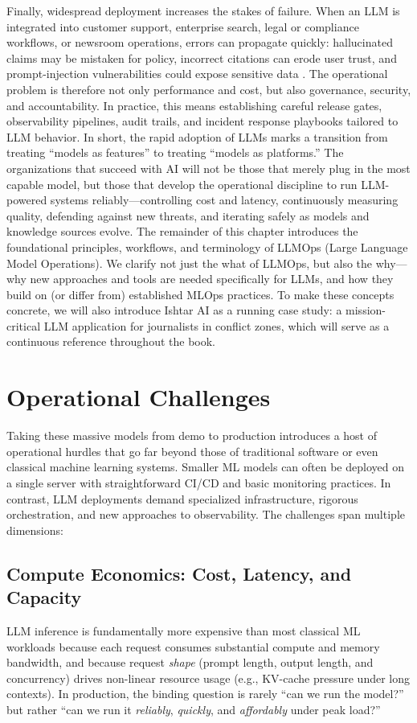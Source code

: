 Finally, widespread deployment increases the stakes of failure. When an LLM is integrated into customer support, enterprise search, legal or compliance workflows, or newsroom operations, errors can propagate quickly: hallucinated claims may be mistaken for policy, incorrect citations can erode user trust, and prompt-injection vulnerabilities could expose sensitive data \cite{assemblyAI2023decoding}. The operational problem is therefore not only performance and cost, but also governance, security, and accountability. In practice, this means establishing careful release gates, observability pipelines, audit trails, and incident response playbooks tailored to LLM behavior.
In short, the rapid adoption of LLMs marks a transition from treating ``models as features'' to treating ``models as platforms.'' The organizations that succeed with AI will not be those that merely plug in the most capable model, but those that develop the operational discipline to run LLM-powered systems reliably—controlling cost and latency, continuously measuring quality, defending against new threats, and iterating safely as models and knowledge sources evolve.
The remainder of this chapter introduces the foundational principles, workflows, and terminology of LLMOps (Large Language Model Operations). We clarify not just the what of LLMOps, but also the why—why new approaches and tools are needed specifically for LLMs, and how they build on (or differ from) established MLOps practices. To make these concepts concrete, we will also introduce Ishtar AI as a running case study: a mission-critical LLM application for journalists in conflict zones, which will serve as a continuous reference throughout the book.

\section{Operational Challenges}
\label{sec:operational-challenges}
Taking these massive models from demo to production introduces a host of operational hurdles that go far beyond those of traditional software or even classical machine learning systems. Smaller ML models can often be deployed on a single server with straightforward CI/CD and basic monitoring practices. In contrast, LLM deployments demand specialized infrastructure, rigorous orchestration, and new approaches to observability. The challenges span multiple dimensions:

\subsection{Compute Economics: Cost, Latency, and Capacity}
LLM inference is fundamentally more expensive than most classical ML workloads because each request consumes substantial compute and memory bandwidth, and because request \emph{shape} (prompt length, output length, and concurrency) drives non-linear resource usage (e.g., KV-cache pressure under long contexts). In production, the binding question is rarely ``can we run the model?'' but rather ``can we run it \emph{reliably}, \emph{quickly}, and \emph{affordably} under peak load?''

